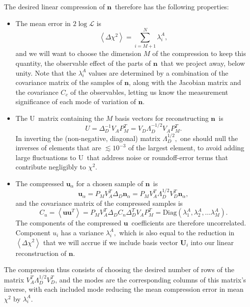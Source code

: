 \documentclass[linenumbers, onecolumn]{aastex63}
\newcommand{\vecn}{\ensuremath{\mathbf{n}}}
\newcommand{\vecu}{\ensuremath{\mathbf{u}}}
\newcommand{\covm}{C}
\newcommand{\matU}{U}
\newcommand{\matV}{V}
\newcommand{\proj}{P}  %
\newcommand{\DD}{\Delta_D}
\newcommand{\likeli}{\mathcal{L}}
\begin{document}
The desired linear compression of \vecn\ therefore has the following properties:
\begin{itemize}
\item The mean error in $2\log \likeli$ is
  \begin{equation}
    \left\langle \Delta\chi^2 \right \rangle = \sum_{i=M+1}^N
    \lambda^A_i,
  \end{equation}
  and we will want to choose the dimension $M$ of the compression to
  keep this quantity, the observable effect of the parts of \vecn\ that we 
  project away,  below unity.
  Note that the $\lambda^A_i$ values are determined by a combination of
  the covariance matrix of the samples of \vecn, along with the Jacobian
  matrix and the covariance $\covm_c$ of the observables, letting us
  know the measurement significance of each mode of variation of \vecn.

  \item The \matU\ matrix containing the $M$ basis vectors for
    reconstructing \vecn\ is
    \begin{equation}
      \matU = \DD^{-1} \matV_A \proj_M^T = \matV_D \Lambda_D^{-1/2}  \matV_A \proj_M^T.
    \end{equation}
    In inverting the (non-negative, diagonal) matrix $\Lambda_D^{1/2},$ one should null the
    inverses of elements that are $\lesssim 10^{-3}$ of the largest
    element, to avoid adding large fluctuations to \matU\ that address
    noise or roundoff-error terms that contribute negligibly to $\chi^2.$ 

  \item The compressed $\vecu_\alpha$ for a chosen sample of \vecn\ is
    \begin{equation}
      \vecu_\alpha = \proj_M \matV_A^T \DD \vecn_\alpha = \proj_M
      \matV_A^T \Lambda_D^{1/2} \matV_D^T \vecn_\alpha,
    \end{equation}
    and the covariance matrix of the compressed samples is
    \begin{equation}
      \covm_u = \left\langle \vecu \vecu^T \right\rangle = \proj_M
      \matV_A^T \DD \covm_n \DD^T \matV_A \proj_M^T = \text{Diag}(\lambda^A_1,
      \lambda^A_2, \ldots \lambda^A_M).
    \end{equation}
The components of the compressed \vecu\ coefficients are therefore
uncorrelated.  Component $u_i$ has a variance
$\lambda^A_i,$ which is also equal to the reduction in $\left\langle
  \Delta \chi^2 \right\rangle$ that we will accrue if we include basis
vector $\mathbf{U}_i$ into our linear reconstruction of \vecn.
\end{itemize}
The compression thus consists of choosing the desired number of rows
of the matrix $ \matV_A^T \Lambda_D^{1/2} \matV_D^T$, and the modes
are the corresponding columns of this matrix's inverse, with each
included mode reducing the mean compression error in mean $\chi^2$ by $\lambda^A_i.$
\end{document}
